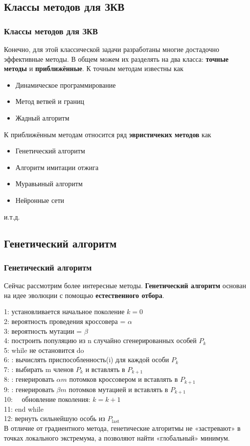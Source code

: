 \documentclass[aspectratio=1610]{beamer}
\begin{document}
\subsection{Классы методов для ЗКВ}
	\begin{frame}
		\frametitle{Классы методов для ЗКВ}
		Конечно, для этой классической задачи разработаны многие достадочно эффективные методы. В общем можем их разделять на два класса: \textbf{точные методы} и \textbf{приближённые}. К точным методам известны как 
		\begin{itemize}
		\item Динамическое  программирование
		\item Метод ветвей и границ
		\item Жадный алгоритм
		\end{itemize}
		К приближённым методам относится ряд \textbf{эвристичеких методов} как
		\begin{itemize}
		\item Генетический алгоритм
		\item Алгоритм имитации отжига
		\item Муравьиный алгоритм
		\item Нейронные сети
		\end{itemize}
		и.т.д. 
	\end{frame}

\subsection{Генетический алгоритм}
	\begin{frame}
		\frametitle{Генетический алгоритм}
		Сейчас рассмотрим более интересные методы. \textbf{Генетический алгоритм} основан на идее эволюции с помощью \textbf{естественного отбора}. 
		
		1: установливается начальное поколение $k=0$\\
		2: вероятность проведения кроссовера = $\alpha$\\
		3: вероятность мутации = $\beta$\\ 
		4: построить популяцию из n случайно сгенерированных особей $P_{k}$\\ 
		5: {\color{red} while} не остановится {\color{red} do} \\
		6: : вычислять приспособленность(i) для каждой особи $P_{k}$\\ 
		7: : выбирать m членов $P_{k}$  и вставлять в $P_{k+1}$\\
		8: : генерировать $\alpha m$ потомков кроссовером и вставлять в $P_{k+1}$ \\
		9: : генерировать $\beta m$  потомков мутацией и вставлять в $P_{k+1}$ \\
		10: \ \ обновление поколения: $k=k+1$ \\
		11: {\color{red} end while}\\
		12: вернуть сильнейшую особь из $P_{\text {last }}$ \\
		В отличие от градиентного метода, генетические алгоритмы не «застревают» в точках локального экстремума, а позволяют найти «глобальный» минимум.
	\end{frame}
\end{document}
